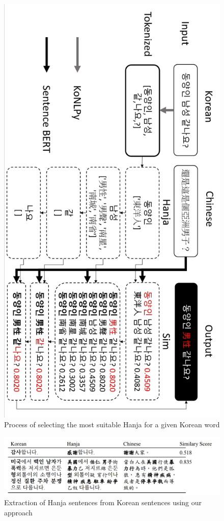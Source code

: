 \documentclass[PhD]{PHlab-thesis}
\begin{document}
\clearpage
\begin{figure}[h!]
  \centering
  \includegraphics[width=0.75\linewidth]{fig_3_7.jpg}
  \captionsetup{type=figure}
  \caption{Process of selecting the most suitable Hanja for a given Korean word}
  \label{fig:example_hanja_process}
\end{figure}


\clearpage
\begin{figure}[h!]
  \centering
  \includegraphics[width=\linewidth]{tab_3_3.jpg}
  \captionsetup{type=table}
  \caption{Extraction of Hanja sentences from Korean sentences using our approach}
  \label{fig:example_hanja_sentences}
\end{figure}
\end{document}
